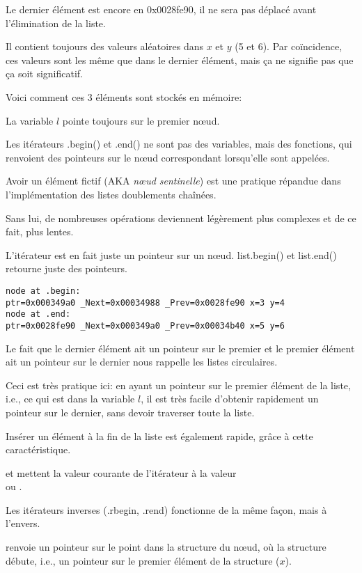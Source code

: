 Le dernier élément est encore en 0x0028fe90, il ne sera pas déplacé avant l'élimination
de la liste.

Il contient toujours des valeurs aléatoires dans $x$ et $y$ (5 et 6).
Par coïncidence, ces valeurs sont les même que dans le dernier élément, mais ça ne
signifie pas que ça soit significatif.

Voici comment ces 3 éléments sont stockés en mémoire:



La variable $l$ pointe toujours sur le premier n\oe{}ud.

Les itérateurs .begin() et .end() ne sont pas des variables, mais des fonctions,
qui renvoient des pointeurs sur le n\oe{}ud correspondant lorsqu'elle sont appelées.

Avoir un élément fictif (\ac{AKA} \emph{n\oe{}ud sentinelle}) est une pratique répandue
dans l'implémentation des listes doublements chaînées.

Sans lui, de nombreuses opérations deviennent légèrement plus complexes et de ce fait,
plus lentes.

L'itérateur est en fait juste un pointeur sur un n\oe{}ud.
list.begin() et list.end() retourne juste des pointeurs.

\begin{lstlisting}
node at .begin:
ptr=0x000349a0 _Next=0x00034988 _Prev=0x0028fe90 x=3 y=4
node at .end:
ptr=0x0028fe90 _Next=0x000349a0 _Prev=0x00034b40 x=5 y=6
\end{lstlisting}

Le fait que le dernier élément ait un pointeur sur le premier et le premier élément
ait un pointeur sur le dernier nous rappelle les listes circulaires.

Ceci est très pratique ici: en ayant un pointeur sur le premier élément de la liste,
i.e., ce qui est dans la variable $l$, il est très facile d'obtenir rapidement
un pointeur sur le dernier, sans devoir traverser toute la liste.

Insérer un élément à la fin de la liste est également rapide, grâce à cette caractéristique.

 et  mettent la valeur courante de l'itérateur à la valeur\\
 ou .

Les itérateurs inverses (.rbegin, .rend) fonctionne de la même façon, mais à l'envers.

 renvoie un pointeur sur le point dans la structure du n\oe{}ud, où la
structure débute, i.e., un pointeur sur le premier élément de la structure ($x$).

